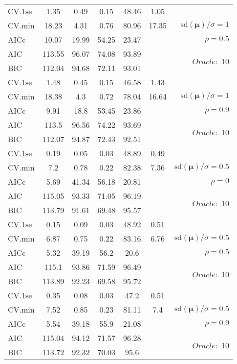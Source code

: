 \begin{table}
\begin{center}
\begin{tabular}{l*{5}{c}|r}
 \hline 
CV.1se & 1.35 & 0.49 & 0.15 & 48.46 & 1.05 & \\
CV.min & 18.23 & 4.31 & 0.76 & 80.96 & 17.35 &  $\mathrm{sd}(\mathbf{\mu})/\sigma=1$ \\
AICc & 10.07 & 19.99 & 54.25 & 23.47 & & $\rho=0.5$ \\
AIC & 113.55 & 96.07 & 74.08 & 93.89 & &  \multirow{2}{*}{$Oracle: $ 10} \\
BIC & 112.04 & 94.68 & 72.11 & 93.01 & &  \\
 \hline 
CV.1se & 1.48 & 0.45 & 0.15 & 46.58 & 1.43 & \\
CV.min & 18.38 & 4.3 & 0.72 & 78.04 & 16.64 &  $\mathrm{sd}(\mathbf{\mu})/\sigma=1$ \\
AICc & 9.91 & 18.8 & 53.45 & 23.86 & & $\rho=0.9$ \\
AIC & 113.5 & 96.56 & 74.22 & 93.69 & &  \multirow{2}{*}{$Oracle: $ 10} \\
BIC & 112.07 & 94.87 & 72.43 & 92.51 & &  \\
 \hline 
CV.1se & 0.19 & 0.05 & 0.03 & 48.89 & 0.49 & \\
CV.min & 7.2 & 0.78 & 0.22 & 82.38 & 7.36 &  $\mathrm{sd}(\mathbf{\mu})/\sigma=0.5$ \\
AICc & 5.69 & 41.34 & 56.18 & 20.81 & & $\rho=0$ \\
AIC & 115.05 & 93.33 & 71.05 & 96.19 & &  \multirow{2}{*}{$Oracle: $ 10} \\
BIC & 113.79 & 91.61 & 69.48 & 95.57 & &  \\
 \hline 
CV.1se & 0.15 & 0.09 & 0.03 & 48.92 & 0.51 & \\
CV.min & 6.87 & 0.75 & 0.22 & 83.16 & 6.76 &  $\mathrm{sd}(\mathbf{\mu})/\sigma=0.5$ \\
AICc & 5.32 & 39.19 & 56.2 & 20.6 & & $\rho=0.5$ \\
AIC & 115.1 & 93.86 & 71.59 & 96.49 & &  \multirow{2}{*}{$Oracle: $ 10} \\
BIC & 113.89 & 92.23 & 69.58 & 95.72 & &  \\
 \hline 
CV.1se & 0.35 & 0.08 & 0.03 & 47.2 & 0.51 & \\
CV.min & 7.52 & 0.85 & 0.23 & 81.11 & 7.4 &  $\mathrm{sd}(\mathbf{\mu})/\sigma=0.5$ \\
AICc & 5.54 & 39.18 & 55.9 & 21.08 & & $\rho=0.9$ \\
AIC & 115.04 & 94.12 & 71.57 & 96.28 & &  \multirow{2}{*}{$Oracle: $ 10} \\
BIC & 113.72 & 92.32 & 70.03 & 95.6 & &  \\
 \hline 
\end{tabular}
\end{center}
\vspace{-1cm}
\end{table}





